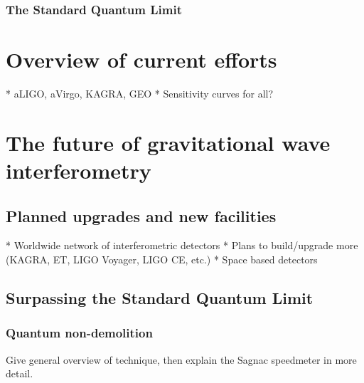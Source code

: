 \subsubsection{The Standard Quantum Limit}

\section{Overview of current efforts}
* aLIGO, aVirgo, KAGRA, GEO
* Sensitivity curves for all?

\section{The future of gravitational wave interferometry}

\subsection{Planned upgrades and new facilities}
* Worldwide network of interferometric detectors
* Plans to build/upgrade more (KAGRA, ET, LIGO Voyager, LIGO CE, etc.)
* Space based detectors

\subsection{Surpassing the Standard Quantum Limit}
\subsubsection{Quantum non-demolition}
Give general overview of technique, then explain the Sagnac speedmeter in more detail.